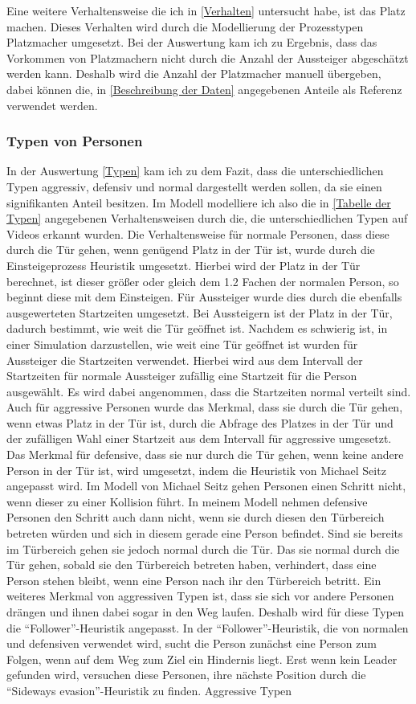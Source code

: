 Eine weitere Verhaltensweise die ich in \ref{Verhalten} untersucht habe, ist das Platz machen. Dieses Verhalten wird durch die Modellierung der Prozesstypen Platzmacher umgesetzt. Bei der Auswertung kam ich zu Ergebnis, dass das Vorkommen von Platzmachern nicht durch die Anzahl der Aussteiger abgeschätzt werden kann. Deshalb wird die Anzahl der Platzmacher manuell übergeben, dabei können die, in \ref{Beschreibung der Daten} angegebenen Anteile als Referenz verwendet werden.
\subsubsection{Typen von Personen}
In der Auswertung \ref{Typen} kam ich zu dem Fazit, dass die unterschiedlichen Typen aggressiv, defensiv und normal dargestellt werden sollen, da sie einen signifikanten Anteil besitzen. Im Modell modelliere ich also die in \ref{Tabelle der Typen} angegebenen Verhaltensweisen durch die, die unterschiedlichen Typen auf Videos erkannt wurden. Die Verhaltensweise für normale Personen, dass diese durch die Tür gehen, wenn genügend Platz in der Tür ist, wurde durch die Einsteigeprozess Heuristik umgesetzt. Hierbei wird der Platz in der Tür berechnet, ist dieser größer oder gleich dem 1.2 Fachen der normalen Person, so beginnt diese mit dem Einsteigen. Für Aussteiger wurde dies durch die ebenfalls ausgewerteten Startzeiten umgesetzt. Bei Aussteigern ist der Platz in der Tür, dadurch bestimmt, wie weit die Tür geöffnet ist. Nachdem es schwierig ist, in einer Simulation darzustellen, wie weit eine Tür geöffnet ist wurden für Aussteiger die Startzeiten verwendet. Hierbei wird aus dem Intervall der Startzeiten für normale Aussteiger zufällig eine Startzeit für die Person ausgewählt. Es wird dabei angenommen, dass die Startzeiten normal verteilt sind. Auch für aggressive Personen wurde das Merkmal, dass sie durch die Tür gehen, wenn etwas Platz in der Tür ist, durch die Abfrage des Platzes in der Tür und der zufälligen Wahl einer Startzeit aus dem Intervall für aggressive umgesetzt. Das Merkmal für defensive, dass sie nur durch die Tür gehen, wenn keine andere Person in der Tür ist, wird umgesetzt, indem die Heuristik von Michael Seitz angepasst wird. Im Modell von Michael Seitz gehen Personen einen Schritt nicht, wenn dieser zu einer Kollision führt. In meinem Modell nehmen defensive Personen den Schritt auch dann nicht, wenn sie durch diesen den Türbereich betreten würden und sich in diesem gerade eine Person befindet. Sind sie bereits im Türbereich gehen sie jedoch normal durch die Tür. Das sie normal durch die Tür gehen, sobald sie den Türbereich betreten haben, verhindert, dass eine Person stehen bleibt, wenn eine Person nach ihr den Türbereich betritt. Ein weiteres Merkmal von aggressiven Typen ist, dass sie sich vor andere Personen drängen und ihnen dabei sogar in den Weg laufen. Deshalb wird für diese Typen die "`Follower"'-Heuristik angepasst. In der "`Follower"'-Heuristik, die von normalen und defensiven verwendet wird, sucht die Person zunächst eine Person zum Folgen, wenn auf dem Weg zum Ziel ein Hindernis liegt. Erst wenn kein Leader gefunden wird, versuchen diese Personen, ihre nächste Position durch die "`Sideways evasion"'-Heuristik zu finden. Aggressive Typen 